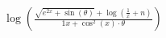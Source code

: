 \documentclass[preview]{standalone}
\begin{document}
\begin{align*}
\log\left( \frac{\sqrt{e^{2x} + \sin(\theta)} + \log\left( \frac{1}{x} + n \right)}{1x + \cos^2(x) \cdot \theta} \right)
\end{align*}
\end{document}
